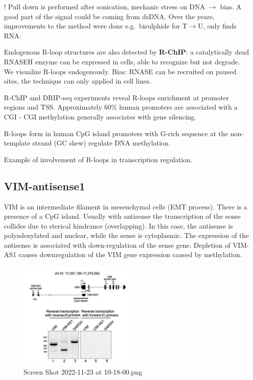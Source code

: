 ! Pull down is performed after sonication, mechanic stress on DNA $\rightarrow$ bias. A good part of the signal could be coming from dsDNA. Over the years, improvements to the method were done e.g.~bisulphide for T$\rightarrow$U, only finds RNA.

Endogenous R-loop structures are also detected by \textbf{R-ChIP}: a catalytically dead RNASEH enzyme can be expressed in cells, able to recognize but not degrade. We visualize R-loops endogenously. Bias: RNASE can be recruited on paused sites, the technique can only applied in cell lines.

R-ChIP and DRIP-seq experiments reveal R-loops enrichment at promoter regions and TSS. Approximately 60\% human promoters are associated with a CGI - CGI methylation generally associates with gene silencing.

R-loops form in human CpG island promoters with G-rich sequence at the non-template strand (GC skew) regulate DNA methylation.

Example of involvement of R-loops in transcription regulation.

\hypertarget{vim-antisense1}{%
\subsection{VIM-antisense1}\label{vim-antisense1}}

VIM is an intermediate filament in mesenchymal cells (EMT process). There is a presence of a CpG island. Usually with antisense the transcription of the sense collides due to sterical hindrance (overlapping). In this case, the antisense is polyadenylated and nuclear, while the sense is cytoplasmic. The expression of the antisense is associated with down-regulation of the sense gene. Depletion of VIM-AS1 causes downregulation of the VIM gene expression caused by methylation.

\begin{figure}
\centering
\includegraphics[width=0.5\textwidth]{../_resources/Screen_Shot_2022-11-23_at_10-18-00.png}
\caption{Screen Shot 2022-11-23 at 10-18-00.png}
\end{figure}


